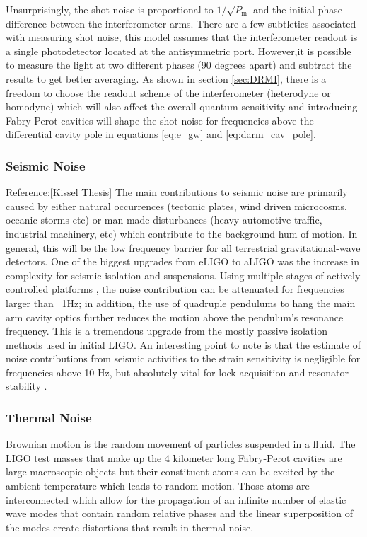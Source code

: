 		Unsurprisingly, the shot noise is proportional to $1/\sqrt{P_{\text{in}}}$ and the initial phase difference between the interferometer arms. There are a few subtleties associated with measuring shot noise, this model assumes that the interferometer readout is a single photodetector located at the antisymmetric port.  However,it is possible to measure the light at two different phases (90 degrees apart) and subtract the results to get better averaging.   As shown in section \ref{sec:DRMI}, there is a freedom to choose the readout scheme of the interferometer (heterodyne or homodyne) which will also affect the overall quantum sensitivity and introducing Fabry-Perot cavities will shape the shot noise for frequencies above the differential cavity pole in equations \ref{eq:e_gw} and \ref{eq:darm_cav_pole}.
		
		\subsubsection{Seismic Noise}
		Reference:[Kissel Thesis]
		The main contributions to seismic noise are primarily caused by either natural occurrences  (tectonic plates, wind driven microcosms, oceanic storms etc) or man-made disturbances (heavy automotive traffic, industrial machinery, etc) which contribute to the background hum of motion.  In general, this will be the low frequency barrier for all terrestrial gravitational-wave detectors.  One of the biggest upgrades from eLIGO to aLIGO was the increase in complexity for seismic isolation and suspensions.  Using multiple stages of actively controlled platforms \cite{fabrice_sei1} \cite{fabrice_sei2} \cite{fabrice_strat}\cite{sei_isol}, the noise contribution can be attenuated for frequencies larger than ~1Hz;  in addition, the use of quadruple pendulums to hang the main arm cavity optics further reduces the motion above the pendulum's resonance frequency\cite{driggers_global}\cite{BlairBook}. This is a tremendous upgrade from the mostly passive isolation methods used in initial LIGO.  An interesting point to note is that the estimate of noise contributions from seismic activities to the strain sensitivity is negligible for frequencies above 10 Hz, but absolutely vital for lock acquisition and resonator stability \cite{Hang_LF} \cite{Fritschel_alignment}.
		
		\subsubsection{Thermal Noise}
		Brownian motion \cite{brownian_einstein} is the random movement of particles suspended in a fluid.  The LIGO test masses that make up the 4 kilometer long Fabry-Perot cavities are large macroscopic objects but their constituent atoms can be excited by the ambient temperature which leads to random motion. Those atoms are interconnected which allow for the propagation of an infinite number of elastic wave modes that contain random relative phases and the linear superposition of the modes create distortions that result in thermal noise.	
	
